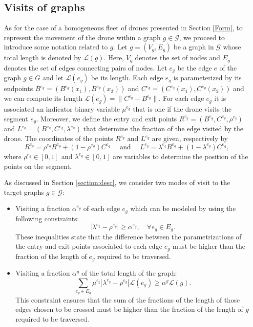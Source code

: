\subsection*{Visits of graphs}
\noindent
As for the case of a homogeneous fleet of drones presented in Section \ref{Form}, to represent the movement of the drone within a graph $g\in\mathcal G$, we proceed to introduce some notation related to $g$.
Let $g = (V_g, E_g)$ be a graph in $\mathcal G$ whose total length is denoted by $\mathcal L(g)$. Here, $V_g$ denotes the set of nodes and $E_g$ denotes the set of edges connecting pairs of nodes.  Let $e_g$ be the edge $e$ of the graph $g \in G$ and let $\mathcal  L(e_g)$ be its length. Each edge $e_g$ is parameterized by its endpoints $B^{e_g}= (B^{e_g}(x_1), B^{e_g}(x_2))$ and $C^{e_g}= (C^{e_g}(x_1), C^{e_g}(x_2))$ and we can compute its length $\mathcal L(e_g) =\|C^{e_g} -  B^{e_g}\|$. 
\noindent
For each edge $e_g$ it is associated an indicator binary variable $\mu^{e_g}$ that is one if the drone visits the segment $e_g$. Moreover, we define the entry and exit points $R^{e_g}=(B^{e_g},C^{e_g},\rho^{e_g})$ and $L^{e_g}=(B^{e_g},C^{e_g},\lambda^{e_g})$ that determine the fraction of the edge visited by the drone. The coordinates of the points $R^{e_g}$ and $L^{e_g}$ are given, respectively by 
$$R^{e_g} = \rho^{e_g} B^{e_g} + (1- \rho^{e_g})C^{e_g} \quad\text{ and }\quad L^{e_g} = \lambda^{e_g} B^{e_g} + (1- \lambda^{e_g})C^{e_g},$$ where $\rho^{e_g} \in [0,1]$ and $\lambda^{e_g} \in [0,1]$ are variables to determine the position of the points on the segment.

\noindent
As discussed in Section \ref{section:desc}, we consider two modes of visit to the target graphs $g\in \mathcal{G}$:
\begin{itemize}
    \item Visiting a fraction $\alpha^{e_g}$ of each edge $e_g$ which can be modeled by using the following constraints:
    \begin{equation}\label{eq:NOalphaE}\tag{$\alpha$-E}
    |\lambda^{e_g} - \rho^{e_g}|\geq \alpha^{e_g}, \quad \forall e_g\in E_g.
    \end{equation}
    These inequalities state that the difference between the parametrizations of the entry and exit points associated to each edge $e_g$ must be higher than the fraction of the length of $e_g$ required to be traversed.
    \item Visiting a fraction $\alpha^g$ of the total length of the graph:
    \begin{equation}\label{eq:NOalphaG}\tag{$\alpha$-G}
    \sum_{e_g\in E_g} \mu^{e_g}|\lambda^{e_g} - \rho^{e_g}|\mathcal L(e_g) \geq \alpha^g\mathcal L(g).
    \end{equation}
    \noindent
    This constraint ensures that the sum of the fractions of the length of those edges chosen to be crossed must be higher than the fraction of the length of $g$ required to be traversed.
\end{itemize}



